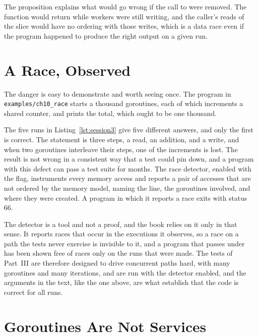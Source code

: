 The proposition explains what would go wrong if the call to  were removed. The function would return while workers were still writing, and the caller's reads of the slice would have no ordering with those writes, which is a data race even if the program happened to produce the right output on a given run.

\section{A Race, Observed}

The danger is easy to demonstrate and worth seeing once. The program in \texttt{examples/\allowbreak ch10\_\allowbreak race} starts a thousand goroutines, each of which increments a shared counter, and prints the total, which ought to be one thousand.




The five runs in Listing~\ref{lst:session3} give five different answers, and only the first is correct. The statement  is three steps, a read, an addition, and a write, and when two goroutines interleave their steps, one of the increments is lost. The result is not wrong in a consistent way that a test could pin down, and a program with this defect can pass a test suite for months. The race detector, enabled with the  flag, instruments every memory access and reports a pair of accesses that are not ordered by the memory model, naming the line, the goroutines involved, and where they were created. A program in which it reports a race exits with status 66.

The detector is a tool and not a proof, and the book relies on it only in that sense. It reports races that occur in the executions it observes, so a race on a path the tests never exercise is invisible to it, and a program that passes under  has been shown free of races only on the runs that were made. The tests of Part~III are therefore designed to drive concurrent paths hard, with many goroutines and many iterations, and are run with the detector enabled, and the arguments in the text, like the one above, are what establish that the code is correct for all runs.

\section{Goroutines Are Not Services}

